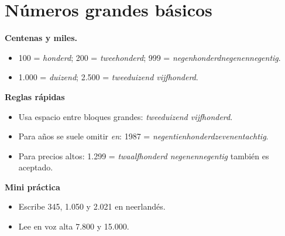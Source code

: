 \section{Números grandes básicos}
\textbf{Centenas y miles.}
\begin{itemize}[leftmargin=*]
  \item 100 = \textit{honderd}; 200 = \textit{tweehonderd}; 999 = \textit{negenhonderdnegenennegentig}.
  \item 1.000 = \textit{duizend}; 2.500 = \textit{tweeduizend vijfhonderd}.
\end{itemize}

\textbf{Reglas rápidas}
\begin{itemize}[leftmargin=*]
  \item Usa espacio entre bloques grandes: \textit{tweeduizend vijfhonderd}.
  \item Para años se suele omitir \textit{en}: 1987 = \textit{negentienhonderdzevenentachtig}.
  \item Para precios altos: 1.299 = \textit{twaalfhonderd negenennegentig} también es aceptado.
\end{itemize}

\textbf{Mini práctica}
\begin{itemize}[leftmargin=*]
  \item Escribe 345, 1.050 y 2.021 en neerlandés.
  \item Lee en voz alta 7.800 y 15.000.
\end{itemize}
